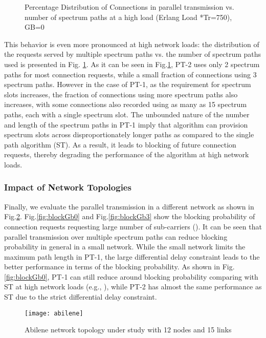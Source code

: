 \documentclass[conference]{IEEEtran}
\begin{document}
\begin{figure}
 \caption{Percentage Distribution of Connections in parallel transmission vs. number of spectrum paths at a high load (Erlang Load *Tr=750), GB=0  }\vspace{-0.2cm}
\label{resfigSPDist}
\end{figure}
 This behavior is even more pronounced at high network loads: the distribution of the requests served by multiple 
 spectrum paths vs. the number  of spectrum paths used is presented in Fig. \ref{resfigSPDist}. As it can be seen in Fig.\ref{resfigSPDist}, PT-2  uses only 2 spectrum paths for most connection requests, while a small fraction of 
 connections using 3 spectrum paths. However in the case of PT-1, as the requirement for spectrum slots increases, the 
 fraction of connections using more spectrum paths also increases, with some connections also recorded using as many 
 as 15  spectrum paths, each with a single spectrum slot.  The unbounded nature of the number and  length of the 
 spectrum paths in PT-1 imply that  algorithm can provision spectrum slots across disproportionately longer paths as 
 compared to the single path algorithm (ST). As a result, it leads to blocking of future connection requests, thereby 
 degrading the performance of the algorithm at high network loads.



 \subsubsection{Impact of Network Topologies}
  Finally, we evaluate the parallel transmission in a different network as shown in Fig.\ref{fig:abilene}. Fig.\ref{fig:blockGb0} and Fig.\ref{fig:blockGb3} show the blocking probability of connection requests requesting large number of sub-carriers (). It can be seen that parallel transmission over multiple spectrum paths can reduce blocking probability in general in a small network. While the small network limits the maximum path length in PT-1, the large differential delay constraint leads to the better performance in terms of the blocking probability. As shown in Fig.\ref{fig:blockGb0}, PT-1 can still reduce around  blocking probability comparing with ST at high network loads (e.g., ), while PT-2 has almost the same performance as ST due to the strict differential delay constraint. 
   \begin{figure}
	\centering
	\texttt{[image: abilene]} 
  \caption{Abilene network topology \cite{SNDlib} under study with 12 nodes and 15 links} \label{fig:abilene} \vspace{-0.3cm}
 \end{figure} 
 
\end{document}
